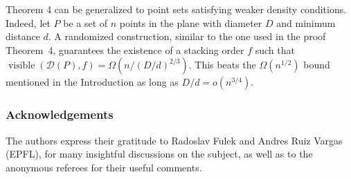 \documentclass[11pt]{article}
\DeclareMathOperator{\vis}{\mathrm{visible}}
\begin{document}
\medskip

Theorem 4 can be generalized to point sets satisfying weaker density conditions. Indeed, let $P$ be a set of $n$ points in the plane with diameter $D$ and minimum distance $d$. A randomized construction, similar to the one used in the proof Theorem~4, guarantees the existence of a stacking order $f$ such that $\vis(\mathcal
D(P),f)=\Omega(n/(D/d)^{2/3})$. This beats the $\Omega(n^{1/2})$ bound
mentioned in the Introduction as long as $D/d=o(n^{3/4})$.

\medskip

\subsubsection*{Acknowledgements} The authors express their gratitude to Radoslav Fulek and Andres Ruiz Vargas (EPFL), for many insightful discussions on the subject, as well as to the anonymous referees for their useful comments.
\end{document}
